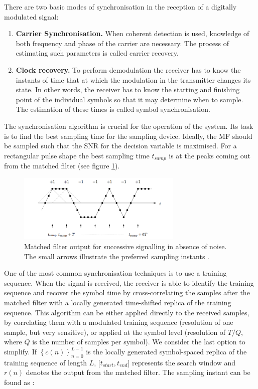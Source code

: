 \documentclass[12pt,a4paper,openright]{report}
\begin{document}
There are two basic modes of synchronisation in the reception of a digitally modulated signal:
\begin{enumerate}
\item \textbf{Carrier Synchronisation.}  When coherent detection is used, knowledge of both  frequency and phase of the carrier are necessary. The process of estimating such parameters is called carrier recovery.

\item \textbf{Clock recovery.} To perform demodulation the receiver has to know the instants of time that at which the modulation in the transmitter changes its state. In other words, the receiver has to know the starting and finishing point of the individual symbols so that it may determine when to sample. The estimation of these times is called symbol synchronisation. 
\end{enumerate}

The synchronisation algorithm is crucial for the operation of the system. Its task is to find the best sampling time for the sampling device. Ideally, the MF should be sampled such that the SNR for the decision variable is maximised. For a rectangular pulse shape the best sampling time $t_{samp}$ is at the peaks coming out from the matched filter (see figure \ref{fig:mfpeaks}).

 \begin{figure}[H]
  \centering
    \includegraphics[width=0.7\textwidth]{mfpeaks.pdf}
    \caption[Matched filter output for successive signalling in absence of noise]{Matched filter output for successive signalling in absence of noise. The small arrows illustrate the preferred sampling instants \cite{ProjectEQ2310}.}
    \label{fig:mfpeaks}
\end{figure}

One of the most common synchronisation techniques is to use a training sequence. When the signal is received, the receiver is able to identify the training sequence and recover the symbol time by cross-correlating the samples after the matched filter with a locally generated time-shifted replica of the training sequence. This algorithm can be either applied directly to the received samples, by correlating them with a modulated training sequence (resolution of one sample, but very sensitive), or applied at the symbol level (resolution of $T/Q$, where $Q$ is the number of samples per symbol). We consider the last option to simplify. If ${\left\{ {c(n)} \right\}_{n = 0}^{L - 1}}$ is the locally generated symbol-spaced replica of the training sequence of length $L$, [$t_{start},t_{end}$] represents the search window and $r(n)$ denotes the output from the matched filter. The sampling instant can be found as \cite{ProjectEQ2310}:
\end{document}
